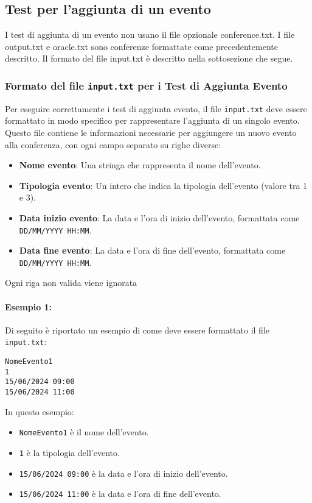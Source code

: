\documentclass[11pt]{scrartcl} %
\begin{document}
\subsection{Test per l'aggiunta di un evento}
I test di aggiunta di un evento non usano il file opzionale conference.txt. I file output.txt e oracle.txt sono conferenze formattate come precedentemente descritto. Il formato del file input.txt è descritto nella sottosezione che segue.

\subsubsection{Formato del file \texttt{input.txt} per i Test di Aggiunta Evento}

Per eseguire correttamente i test di aggiunta evento, il file \texttt{input.txt} deve essere formattato in modo specifico per rappresentare l'aggiunta di un singolo evento. Questo file contiene le informazioni necessarie per aggiungere un nuovo evento alla conferenza, con ogni campo separato su righe diverse:

\begin{itemize}
	\item \textbf{Nome evento}: Una stringa che rappresenta il nome dell'evento.
	\item \textbf{Tipologia evento}: Un intero che indica la tipologia dell'evento (valore tra 1 e 3).
	\item \textbf{Data inizio evento}: La data e l'ora di inizio dell'evento, formattata come \texttt{DD/MM/YYYY HH:MM}.
	\item \textbf{Data fine evento}: La data e l'ora di fine dell'evento, formattata come \texttt{DD/MM/YYYY HH:MM}.
\end{itemize}

Ogni riga non valida viene ignorata

\paragraph{Esempio 1:}
Di seguito è riportato un esempio di come deve essere formattato il file \texttt{input.txt}:

\begin{lstlisting}
NomeEvento1
1
15/06/2024 09:00
15/06/2024 11:00
\end{lstlisting}

In questo esempio:
\begin{itemize}
	\item \texttt{NomeEvento1} è il nome dell'evento.
	\item \texttt{1} è la tipologia dell'evento.
	\item \texttt{15/06/2024 09:00} è la data e l'ora di inizio dell'evento.
	\item \texttt{15/06/2024 11:00} è la data e l'ora di fine dell'evento.
\end{itemize}
\end{document}
